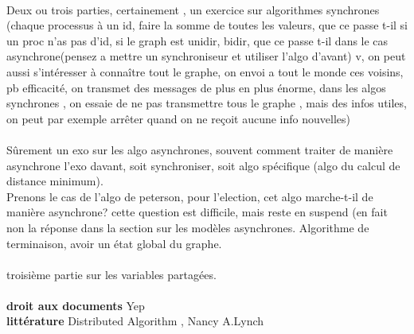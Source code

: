 \documentclass{article}
\begin{document}
\paragraph{} Deux ou trois parties, certainement , un exercice sur algorithmes synchrones (chaque processus à un id, faire la somme de toutes les valeurs, que ce passe t-il si un proc n'as pas d'id, si le graph est unidir, bidir, que ce passe t-il dans le cas asynchrone(pensez a mettre un synchroniseur et utiliser l'algo d'avant) v, on peut aussi s’intéresser à connaître tout le graphe, on envoi a tout le monde ces voisins, pb efficacité, on transmet des messages de plus en plus énorme, dans les algos synchrones , on essaie de ne pas transmettre tous le graphe , mais des infos utiles, on peut par exemple arrêter quand on ne reçoit aucune info nouvelles)\\\\
Sûrement un exo sur les algo asynchrones, souvent comment traiter de manière asynchrone l'exo davant, soit synchroniser, soit algo spécifique (algo du calcul de distance minimum).\\ Prenons le cas de l'algo de peterson, pour l'election, cet algo marche-t-il de manière asynchrone? cette question est difficile, mais reste en suspend (en fait non la réponse dans la section sur les modèles asynchrones. Algorithme de terminaison, avoir un état global du graphe. \\\\
troisième partie sur les variables partagées.\\\\
\textbf{droit aux documents} Yep \\
\textbf{littérature}
Distributed Algorithm , Nancy A.Lynch
\end{document}
